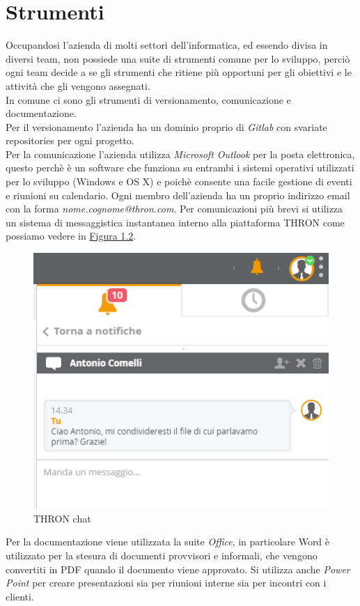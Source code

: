 \documentclass[a4paper, 12pt, twoside, openright]{book}
\begin{document}
\newpage{}
\section{Strumenti}
Occupandosi l'azienda di molti settori dell'informatica, ed essendo divisa in diversi team, non possiede una suite di strumenti comune per lo sviluppo, perciò ogni team decide a se gli strumenti che ritiene più opportuni per gli obiettivi e le attività che gli vengono assegnati.\\
In comune ci sono gli strumenti di versionamento, comunicazione e documentazione.\\

Per il versionamento l'azienda ha un dominio proprio di \textit{Gitlab} con svariate repositories per ogni progetto.\\
Per la comunicazione l'azienda utilizza \textit{Microsoft Outlook} per la posta elettronica, questo perchè è un software che funziona su entrambi i sistemi operativi utilizzati per lo sviluppo (Windows e OS X) e poichè consente una facile gestione di eventi e riunioni su calendario. Ogni membro dell'azienda ha un proprio indirizzo email con la forma \textit{nome.cognome@thron.com}. Per comunicazioni più brevi si utilizza un sistema di messaggistica instantanea interno alla piattaforma THRON come possiamo vedere in \hyperref[esempio-chat]{Figura 1.2}.
\begin{figure}[H]
	\centering
	\label{esempio-chat}
	\includegraphics[scale=0.5]{images/esempio-chat.jpg}
	\caption{THRON chat}
\end{figure}
Per la documentazione viene utilizzata la suite \textit{Office}, in particolare Word è utilizzato per la stesura di documenti provvisori e informali, che vengono convertiti in PDF quando il documento viene approvato. Si utilizza anche \textit{Power Point} per creare presentazioni sia per riunioni interne sia per incontri con i clienti.\\
\end{document}
